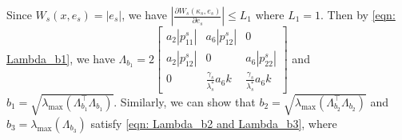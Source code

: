 %
Since $W_s(x,e_s) = |e_s|$, we have $\left|\tfrac{\partial W_s(\kappa_s,e_s)}{\partial e_s} \right| \leq L_1$ where $L_1 = 1$. Then by \eqref{eqn: Lambda_b1}, we have 
$
    \Lambda_{b_1} = 2
            \left[ \begin{smallmatrix}
            a_2 |p_{11}^s| & a_6 |p_{12}^s|                    & 0 \\
            a_2 |p_{12}^s| & 0                               & a_6 |p_{22}^s| \\
            0          & \tfrac{\gamma_s}{\lambda_s^*}a_6k & \tfrac{\gamma_s}{\lambda_s^*}a_6k
        \end{smallmatrix} \right]$
%
and $b_1 = \sqrt{\lambda_{\text{max}} (\Lambda_{b_1}^\top \Lambda_{b_1})}$. Similarly, we can show that $b_2 = \sqrt{\lambda_{\text{max}}(\Lambda_{b_2}^\top \Lambda_{b_2}) }$ and $b_3 = \lambda_{\text{max}}(\Lambda_{b_3})$ satisfy \eqref{eqn: Lambda_b2 and Lambda_b3}, where %
